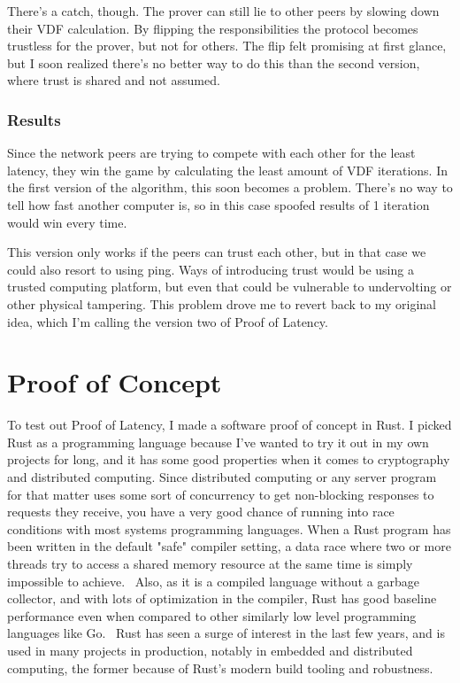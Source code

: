 There's a catch, though. The prover can still lie to other peers by slowing down their VDF calculation. By flipping the responsibilities the protocol becomes trustless for the prover, but not for others. The flip felt promising at first glance, but I soon realized there's no better way to do this than the second version, where trust is shared and not assumed.

\subsection{Results}
Since the network peers are trying to compete with each other for the least latency, they win the game by calculating the least amount of VDF iterations. In the first version of the algorithm, this soon becomes a problem. There's no way to tell how fast another computer is, so in this case spoofed results of 1 iteration would win every time.

This version only works if the peers can trust each other, but in that case we could also resort to using ping. Ways of introducing trust would be using a trusted computing platform, but even that could be vulnerable to undervolting or other physical tampering. This problem drove me to revert back to my original idea, which I'm calling the version two of Proof of Latency.

\chapter{Proof of Concept}
\label{Proof of Concept}
To test out Proof of Latency, I made a software proof of concept in Rust. I picked Rust as a programming language because I've wanted to try it out in my own projects for long, and it has some good properties when it comes to cryptography and distributed computing. Since distributed computing or any server program for that matter uses some sort of concurrency to get non-blocking responses to requests they receive, you have a very good chance of running into race conditions with most systems programming languages. When a Rust program has been written in the default "safe" compiler setting, a data race where two or more threads try to access a shared memory resource at the same time is simply impossible to achieve.~\cite{The_Rust_Project_Developers2018-xh} Also, as it is a compiled language without a garbage collector, and with lots of optimization in the compiler, Rust has good baseline performance even when compared to other similarly low level programming languages like Go.~\cite{Howarth2020-zc} Rust has seen a surge of interest in the last few years, and is used in many projects in production, notably in embedded and distributed computing, the former because of Rust's modern build tooling and robustness.

